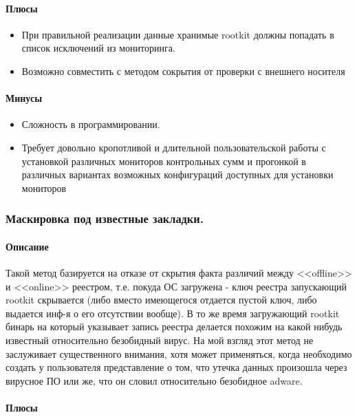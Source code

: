 \paragraph{Плюсы\\}

\begin{itemize}
\item{При правильной реализации данные хранимые rootkit должны
 попадать в список исключений из мониторинга.}
\item{Возможно совместить с методом сокрытия от проверки с внешнего носителя}
\end{itemize}

\paragraph{Минусы\\}

\begin{itemize}
\item{Сложность в программировании.}
\item{Требует довольно кропотливой и длительной пользовательской работы с
установкой различных мониторов контрольных сумм и прогонкой в различных
вариантах возможных конфигураций доступных для установки мониторов}
\end{itemize}


\subsubsection{Маскировка под известные закладки.}
\paragraph{Описание\\}
Такой метод базируется на отказе от скрытия факта различий между
<<offline>> и  <<online>> реестром, т.е. покуда ОС загружена - ключ
реестра запускающий rootkit скрывается (либо вместо имеющегося отдается
пустой ключ, либо выдается инф-я о его отсутствии вообще). В то же время
загружающий rootkit бинарь на который указывает запись реестра делается
похожим на какой нибудь известный относительно безобидный вирус. На мой
взгляд этот метод не заслуживает существенного внимания, хотя может
применяться, когда необходимо создать у пользователя представление о
том, что утечка данных произошла через вирусное ПО или же, что он словил
относительно безобидное adware.

\paragraph{Плюсы\\}

